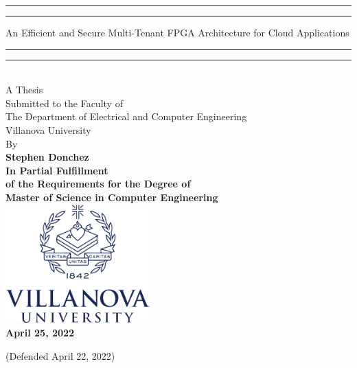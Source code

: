 \begin{titlepage}
    \begingroup

\centering

\sffamily\bfseries\fontsize{24.88}{31.2}\selectfont
\rule{\textwidth}{1.6pt}\vspace*{-\baselineskip}\vspace*{2pt} %
	\rule{\textwidth}{0.4pt} %
	
	\vspace{0.5\baselineskip} %
	An Efficient and Secure Multi-Tenant FPGA Architecture for Cloud Applications

\rule{\textwidth}{1.6pt}\vspace*{-\baselineskip}\vspace*{2pt} %
	\rule{\textwidth}{0.4pt} %
\\[0.4in]
\normalfont\large
A Thesis\\
Submitted to the Faculty of\\
The Department of Electrical and Computer Engineering\\
 Villanova University\\
 \vspace{.2in}
 By
\\
\vspace{0.25in}
\sffamily\bfseries\Large
Stephen Donchez
\\[0.4in]
\normalfont\normalsize
In Partial Fulfillment\\ of the Requirements for the Degree of\\

Master of Science in Computer Engineering
\\[1.5em]
\includegraphics[height=1.8in]{ECE_ReportTemplate/vulogo}\\
[2em]
April 25, 2022

(Defended April 22, 2022)
\par
\endgroup

\end{titlepage}